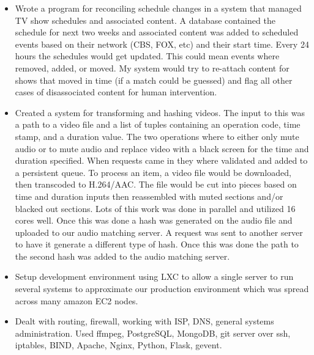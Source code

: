 \documentclass{res}
\begin{document}
\begin{resume}
\begin{itemize}
          \item
	    Wrote a program for reconciling schedule changes in a
            system that managed TV show schedules and associated
            content. A database contained the schedule for next two
            weeks and associated content was added to scheduled events
            based on their network (CBS, FOX, etc) and their start
            time.  Every 24 hours the schedules would get updated.
            This could mean events where removed, added, or moved.  My
            system would try to re-attach content for shows that moved
            in time (if a match could be guessed) and flag all other
            cases of disassociated content for human intervention.
          \item
	    Created a system for transforming and hashing videos.  The
            input to this was a path to a video file and a list of
            tuples containing an operation code, time stamp, and a
            duration value.  The two operations where to either only
            mute audio or to mute audio and replace video with a black
            screen for the time and duration specified.  When requests
            came in they where validated and added to a persistent
            queue.  To process an item, a video file would be
            downloaded, then transcoded to H.264/AAC.  The file would
            be cut into pieces based on time and duration inputs then
            reassembled with muted sections and/or blacked out
            sections.  Lots of this work was done in parallel and
            utilized 16 cores well.  Once this was done a hash was
            generated on the audio file and uploaded to our audio
            matching server. A request was sent to another server to
            have it generate a different type of hash.  Once this was
            done the path to the second hash was added to the audio
            matching server.

          \item
	    Setup development environment using LXC to allow a single
            server to run several systems to approximate our
            production environment which was spread across many amazon
            EC2 nodes.

          \item
	    Dealt with routing, firewall, working with ISP, DNS,
            general systems administration.  Used ffmpeg, PostgreSQL,
            MongoDB, git server over ssh, iptables, BIND, Apache,
            Nginx, Python, Flask, gevent.


\end{itemize}
\end{resume}
\end{document}
